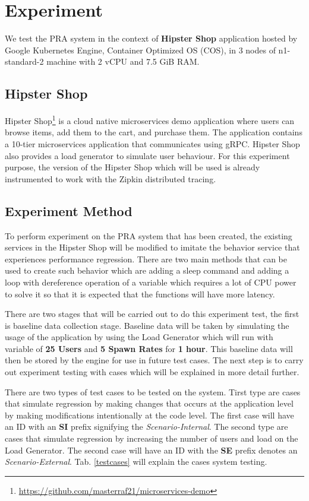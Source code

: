 \documentclass[conference]{configs/IEEEtran}
\begin{document}
\section{Experiment}
We test the PRA system in the context of \textbf{Hipster Shop} application hosted by Google Kubernetes Engine, Container Optimized OS (COS), in 3 nodes of n1-standard-2 machine with 2 vCPU and 7.5 GiB RAM.

\subsection{Hipster Shop}
Hipster Shop\footnote{\url{https://github.com/masterraf21/microservices-demo}} is a cloud native microservices demo application
where users can browse items, add them to the
cart, and purchase them. The application contains a 10-tier
microservices application that communicates using gRPC.
Hipster Shop also provides a load generator to simulate user
behaviour. For this experiment purpose, the version of the Hipster Shop which will be used is already instrumented to work with the Zipkin distributed tracing.

\subsection{Experiment Method}
To perform experiment on the PRA system that has been created, the existing services in the Hipster Shop will be modified to imitate the behavior service that experiences performance regression. There are two main methods that can be used to create such behavior which are adding a sleep command and adding a loop with dereference operation of a variable which requires a lot of CPU power to solve it so that it is expected that the functions will have more latency.

There are two stages that will be carried out to do this experiment test, the first is baseline data collection stage. Baseline data will be taken by simulating
the usage of the application by using the Load Generator which will run with variable of \textbf{25 Users} and \textbf{5 Spawn Rates} for \textbf{1 hour}. This baseline data will then be stored by the engine for use in future test cases. The next step is to carry out experiment testing with cases which will be explained in more detail further.

There are two types of test cases to be tested on the system. Tirst type are cases that simulate regression by making changes that occurs at the application level by making modifications intentionally at the code level.
The first case will have an ID with an \textbf{SI} prefix signifying the \textit{Scenario-Internal}.
The second type are cases that simulate regression by increasing the number of users and load on the Load Generator. The second case will have an ID with the \textbf{SE} prefix denotes an \textit{Scenario-External}. Tab. \ref{testcases} will explain the cases
system testing.
\end{document}
